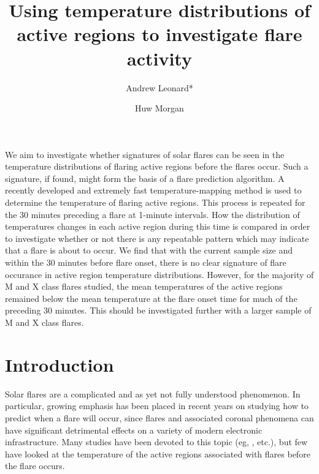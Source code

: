 \documentclass[referee,a4paper,12pt]{swsc}
\author{Andrew Leonard*
        \and Huw Morgan}
\institute{Institute of Mathematics, Physics and Computer Science, Aberystwyth University, Ceredigion, SY23 3BZ, Wales\\
					 \email{\href{mailto:ajl7@aber.ac.uk}{ajl7@aber.ac.uk}}}
\title{Using temperature distributions of active regions to investigate flare activity}
\begin{document}
\begin{linenumbers}


\abstract
	{}
	{We aim to investigate whether signatures of solar flares can be seen in the temperature distributions of flaring active regions before the flares occur. Such a signature, if found, might form the basis of a flare prediction algorithm.}
	{A recently developed and extremely fast temperature-mapping method is used to determine the temperature of flaring active regions. This process is repeated for the 30 minutes preceding a flare at 1-minute intervals. How the distribution of temperatures changes in each active region during this time is compared in order to investigate whether or not there is any repeatable pattern which may indicate that a flare is about to occur.}
	{We find that with the current sample size and within the 30 minutes before flare onset, there is no clear signature of flare occurance in active region temperature distributions. However, for the majority of M and X class flares studied, the mean temperatures of the active regions remained below the mean temperature at the flare onset time for much of the preceding 30 minutes. This should be investigated further with a larger sample of M and X class flares.}
	{}

\maketitle

\section{Introduction}
Solar flares are a complicated and as yet not fully understood phenomenon.
In particular, growing emphasis has been placed in recent years on studying how to predict when a flare will occur, since flares and associated coronal phenomena can have significant detrimental effects on a variety of modern electronic infrastructure. %
Many studies have been devoted to this topic (eg, \citealt{Korsos2014, Ahmed2011, Bloomfield2012}, etc.), but few have looked at the temperature of the active regions associated with flares before the flare occurs. %


\end{linenumbers}
\end{document}
